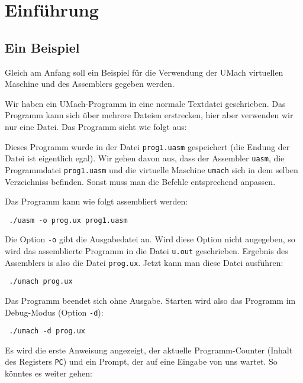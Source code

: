 \section{Einführung}

\subsection{Ein Beispiel}
Gleich am Anfang soll ein Beispiel für die Verwendung der UMach
virtuellen Maschine und des Assemblers gegeben werden.

Wir haben ein UMach-Programm in eine normale Textdatei geschrieben. Das Programm
kann sich über mehrere Dateien erstrecken, hier aber verwenden wir nur eine
Datei. Das Programm sieht wie folgt aus:



Dieses Programm wurde in der Datei \texttt{prog1.uasm} gespeichert (die Endung
der Datei ist eigentlich egal). Wir gehen davon aus, dass der Assembler
\texttt{uasm}, die Programmdatei \texttt{prog1.uasm} und die virtuelle Maschine
\texttt{umach} sich in dem selben Verzeichniss befinden. Sonst muss man die
Befehle entsprechend anpassen.

Das Programm kann wie folgt assembliert werden:
\begin{lstlisting}
 ./uasm -o prog.ux prog1.uasm
\end{lstlisting}

Die Option \texttt{-o} gibt die Ausgabedatei an. Wird diese Option nicht
angegeben, so wird das assemblierte Programm in die Datei \texttt{u.out}
geschrieben. Ergebnis des Assemblers is also die Datei \texttt{prog.ux}. Jetzt
kann man diese Datei \glqq ausführen\grqq:
\begin{lstlisting}
 ./umach prog.ux
\end{lstlisting}
Das Programm beendet sich ohne Ausgabe. Starten wird also das Programm im
Debug-Modus (Option \texttt{-d}):
\begin{lstlisting}
 ./umach -d prog.ux
\end{lstlisting}

Es wird die erste Anweisung angezeigt, der aktuelle Programm-Counter (Inhalt
des Registers \texttt{PC}) und ein Prompt, der auf eine Eingabe von uns wartet.
So könntes es weiter gehen:



